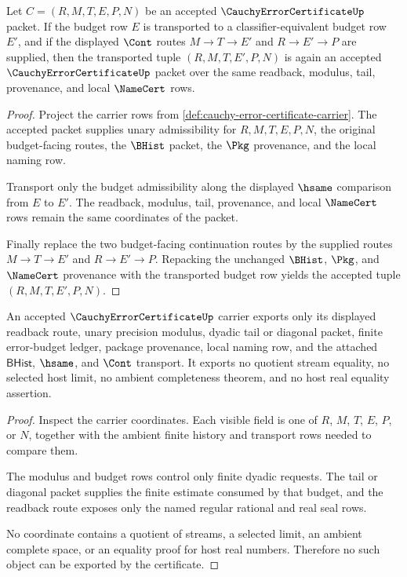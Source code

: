 \begin{theorem}
\label{thm:cauchy-error-certificate-budget-handoff-closure}
Let $C=(R,M,T,E,P,N)$ be an accepted $\CauchyErrorCertificateUp$ packet. If the budget row $E$ is transported to a classifier-equivalent budget row $E'$, and if the displayed $\Cont$ routes $M \to T \to E'$ and $R \to E' \to P$ are supplied, then the transported tuple $(R,M,T,E',P,N)$ is again an accepted $\CauchyErrorCertificateUp$ packet over the same readback, modulus, tail, provenance, and local $\NameCert$ rows.
\end{theorem}
\begin{proof}
Project the carrier rows from \autoref{def:cauchy-error-certificate-carrier}. The accepted packet supplies unary admissibility for $R,M,T,E,P,N$, the original budget-facing routes, the $\BHist$ packet, the $\Pkg$ provenance, and the local naming row.

Transport only the budget admissibility along the displayed $\hsame$ comparison from $E$ to $E'$. The readback, modulus, tail, provenance, and local $\NameCert$ rows remain the same coordinates of the packet.

Finally replace the two budget-facing continuation routes by the supplied routes $M \to T \to E'$ and $R \to E' \to P$. Repacking the unchanged $\BHist$, $\Pkg$, and $\NameCert$ provenance with the transported budget row yields the accepted tuple $(R,M,T,E',P,N)$.
\end{proof}

\begin{theorem}
\label{thm:cauchy-error-certificate-non-escape-boundary}
An accepted $\CauchyErrorCertificateUp$ carrier exports only its displayed readback route, unary precision modulus, dyadic tail or diagonal packet, finite error-budget ledger, package provenance, local naming row, and the attached $\mathsf{BHist}$, $\hsame$, and $\Cont$ transport. It exports no quotient stream equality, no selected host limit, no ambient completeness theorem, and no host real equality assertion.
\end{theorem}
\begin{proof}
Inspect the carrier coordinates. Each visible field is one of $R$, $M$, $T$, $E$, $P$, or $N$, together with the ambient finite history and transport rows needed to compare them.

The modulus and budget rows control only finite dyadic requests. The tail or diagonal packet supplies the finite estimate consumed by that budget, and the readback route exposes only the named regular rational and real seal rows.

No coordinate contains a quotient of streams, a selected limit, an ambient complete space, or an equality proof for host real numbers. Therefore no such object can be exported by the certificate.
\end{proof}

